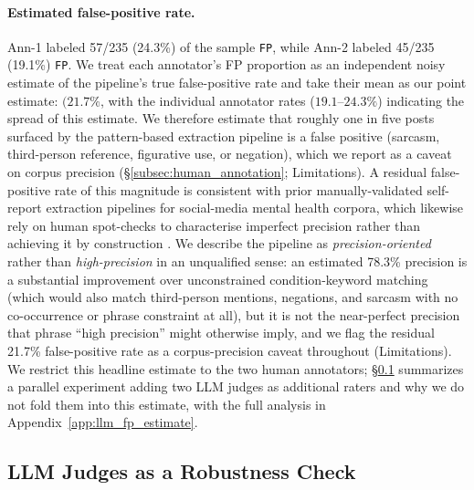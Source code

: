 \documentclass[letterpaper]{article} %
\begin{document}
\paragraph{Estimated false-positive rate.} Ann-1 labeled 57/235 (24.3\%)
of the sample \texttt{FP}, while Ann-2 labeled 45/235 (19.1\%)
\texttt{FP}. We treat each annotator's FP proportion as an independent noisy
estimate of the pipeline's true false-positive rate and take their mean
as our point estimate: $(21.7\%$, with the
individual annotator rates ($19.1$--$24.3\%$) indicating the spread of
this estimate. We therefore estimate that roughly one in five posts
surfaced by the pattern-based extraction pipeline is a false positive
(sarcasm, third-person reference, figurative use, or negation), which
we report as a caveat on corpus precision (§\ref{subsec:human_annotation};
Limitations). A residual false-positive rate of this magnitude is
consistent with prior manually-validated self-report extraction
pipelines for social-media mental health corpora, which likewise rely
on human spot-checks to characterise imperfect precision rather than
achieving it by construction \citep{cohan-etal-2018-smhd,
coppersmith-etal-2014-quantifying}. We describe the pipeline as
\textit{precision-oriented} rather than \textit{high-precision} in an
unqualified sense: an estimated 78.3\% precision is a substantial
improvement over unconstrained condition-keyword matching (which would
also match third-person mentions, negations, and sarcasm with no
co-occurrence or phrase constraint at all), but it is not the near-perfect
precision that phrase ``high precision'' might otherwise imply, and we
flag the residual 21.7\% false-positive rate as a corpus-precision caveat
throughout (Limitations). We restrict this headline estimate
to the two human annotators; \S\ref{subsec:llm_judges} summarizes a
parallel experiment adding two LLM judges as additional raters and why
we do not fold them into this estimate, with the full analysis in
Appendix~\ref{app:llm_fp_estimate}.

\subsection{LLM Judges as a Robustness Check}
\label{subsec:llm_judges}
\end{document}
